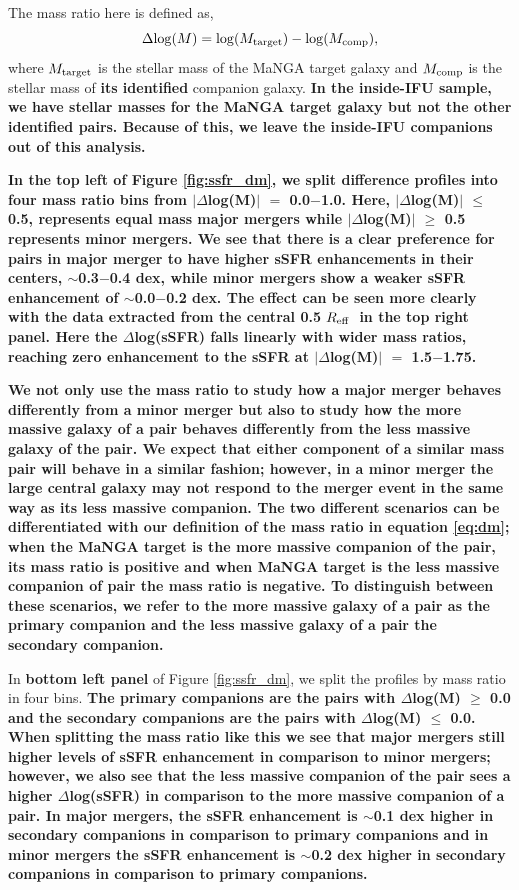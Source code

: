 \documentclass[iop,revtex4,twocolumn,apj,numberedappendix,appendixfloats]{emulateapj}
\newcommand{\reff}{$R_{\rm eff}$}
\begin{document}
The mass ratio here is defined as, 
\begin{equation}\label{eq:dm}
\Delta {\rm log}(M) = {\rm log}(M_{\rm target}) - {\rm log}(M_{\rm comp}),
\end{equation}
where $M_{\rm target}$ is the stellar mass of the MaNGA target galaxy and $M_{\rm comp}$ is the stellar mass of \textbf{its identified} companion galaxy. \textbf{In the inside-IFU sample, we have stellar masses for the MaNGA target galaxy but not the other identified pairs. Because of this, we leave the inside-IFU companions out of this analysis.}

\textbf{In the top left of Figure \ref{fig:ssfr_dm}, we split difference profiles into four mass ratio bins from $|\Delta$log(M)$|$ $=$ 0.0$-$1.0. Here, $|\Delta$log(M)$|$ $\le$ 0.5, represents equal mass major mergers while $|\Delta$log(M)$|$ $\ge$ 0.5 represents minor mergers. We see that there is a clear preference for pairs in major merger to have higher sSFR enhancements in their centers, $\sim$0.3$-$0.4 dex, while minor mergers show a weaker sSFR enhancement of $\sim$0.0$-$0.2 dex. The effect can be seen more clearly with the data extracted from the central 0.5 \reff\ in the top right panel. Here the $\Delta$log(sSFR) falls linearly with wider mass ratios, reaching zero enhancement to the sSFR at $|\Delta$log(M)$|$ $=$ 1.5$-$1.75.}

\textbf{We not only use the mass ratio to study how a major merger behaves differently from a minor merger but also to study how the more massive galaxy of a pair behaves differently from the less massive galaxy of the pair. We expect that either component of a similar mass pair will behave in a similar fashion; however, in a minor merger the large central galaxy may not respond to the merger event in the same way as its less massive companion. The two different scenarios can be differentiated with our definition of the mass ratio in equation \ref{eq:dm}; when the MaNGA target is the more massive companion of the pair, its mass ratio is positive and when MaNGA target is the less massive companion of pair the mass ratio is negative. To distinguish between these scenarios, we refer to the more massive galaxy of a pair as the primary companion and the less massive galaxy of a pair the secondary companion.}

In \textbf{bottom left panel} of Figure \ref{fig:ssfr_dm}, we split the profiles by mass ratio in four bins. \textbf{The primary companions are the pairs with $\Delta$log(M) $\ge$ 0.0 and the secondary companions are the pairs with $\Delta$log(M) $\le$ 0.0. When splitting the mass ratio like this we see that major mergers still higher levels of sSFR enhancement in comparison to minor mergers; however, we also see that the less massive companion of the pair sees a higher $\Delta$log(sSFR) in comparison to the more massive companion of a pair. In major mergers, the sSFR enhancement is $\sim$0.1 dex higher in secondary companions in comparison to primary companions and in minor mergers the sSFR enhancement is $\sim$0.2 dex higher in secondary companions in comparison to primary companions.}
\end{document}
